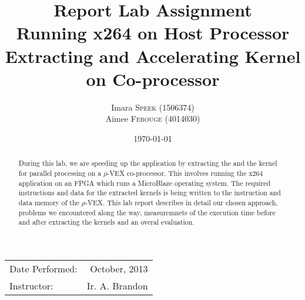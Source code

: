 \documentclass{article}
\title{Report Lab Assignment \\ Running x264 on Host Processor\\ Extracting and Accelerating Kernel on Co-processor} %
\author{Imara \textsc{Speek} (1506374)\\ Aimee \textsc{Ferouge} (4014030)} %
\date{\today} %
\begin{document}
\maketitle %

\begin{center}
\begin{tabular}{l r}
Date Performed: & October, 2013 \\ %
Instructor: & Ir. A. Brandon %
\end{tabular}
\end{center}

 \begin{abstract}
During this lab, we are speeding up the  application by extracting the  and the  kernel for parallel processing on a $\rho$-VEX co-processor. This involves running the x264 application on an FPGA which runs a MicroBlaze operating system. The required instructions and data for the extracted kernels is being written to the instruction and data memory of the $\rho$-VEX. This lab report describes in detail our chosen approach, problems we encountered along the way, measuremnets of the execution time before and after extracting the kernels and an overal evaluation.
 \end{abstract}



 






%

%
%
%
%
%
\end{document}
